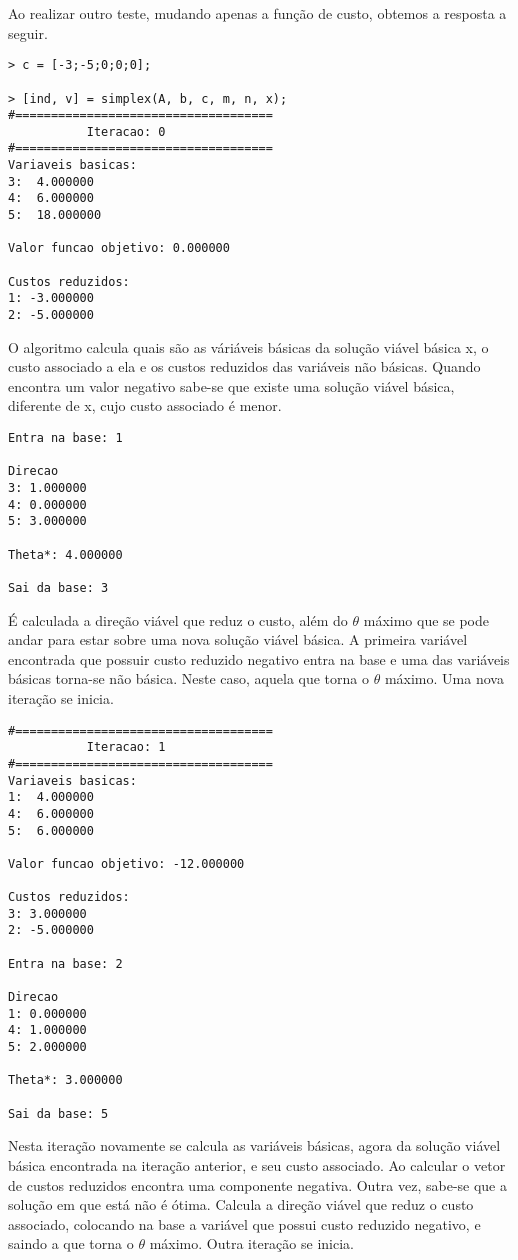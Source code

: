 \documentclass[
	12pt,				%
	openright,			%
	oneside,			%
	a4paper,			%
	english,			%
	french,				%
	spanish,			%
	brazil,				%
	]{abntex2}
\begin{document}
Ao realizar outro teste, mudando apenas a função de custo, obtemos a resposta a seguir. 
\begin{verbatim}
> c = [-3;-5;0;0;0];

> [ind, v] = simplex(A, b, c, m, n, x);
#====================================
           Iteracao: 0
#====================================
Variaveis basicas:
3:  4.000000
4:  6.000000
5:  18.000000

Valor funcao objetivo: 0.000000

Custos reduzidos:
1: -3.000000
2: -5.000000
\end{verbatim}

O algoritmo calcula quais são as váriáveis básicas da solução viável básica x, o custo associado a ela e os custos reduzidos das variáveis não básicas. Quando encontra um valor negativo sabe-se que existe uma solução viável básica, diferente de x, cujo custo associado é menor.

\begin{verbatim}
Entra na base: 1

Direcao
3: 1.000000
4: 0.000000
5: 3.000000

Theta*: 4.000000

Sai da base: 3
\end{verbatim}

É calculada a direção viável que reduz o custo, além do $\theta$ máximo que se pode andar para estar sobre uma nova solução viável básica. A primeira variável encontrada que possuir custo reduzido negativo entra na base e uma das variáveis básicas torna-se não básica. Neste caso, aquela que torna o $\theta$ máximo.
Uma nova iteração se inicia.

\begin{verbatim}
#====================================
           Iteracao: 1
#====================================
Variaveis basicas:
1:  4.000000
4:  6.000000
5:  6.000000

Valor funcao objetivo: -12.000000

Custos reduzidos:
3: 3.000000
2: -5.000000

Entra na base: 2

Direcao
1: 0.000000
4: 1.000000
5: 2.000000

Theta*: 3.000000

Sai da base: 5
\end{verbatim}

Nesta iteração novamente se calcula as variáveis básicas, agora da solução viável básica encontrada na iteração anterior, e seu custo associado. Ao calcular o vetor de custos reduzidos encontra uma componente negativa. Outra vez, sabe-se que a solução em que está não é ótima. Calcula a direção viável que reduz o custo associado, colocando na base a variável que possui custo reduzido negativo, e saindo a que torna o $\theta$ máximo. Outra iteração se inicia.
\end{document}
